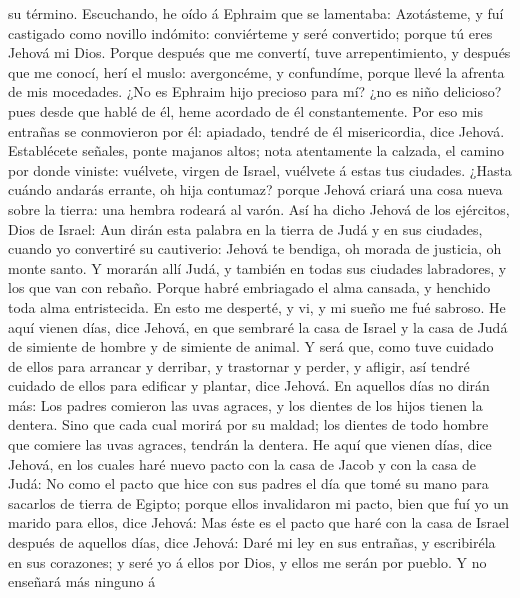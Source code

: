 su término.  Escuchando, he oído á Ephraim que se
lamentaba: Azotásteme, y fuí castigado como novillo indómito:
conviérteme y seré convertido; porque tú eres Jehová mi Dios.
 Porque después que me convertí, tuve arrepentimiento, y
después que me conocí, herí el muslo: avergoncéme, y confundíme, porque
llevé la afrenta de mis mocedades.  ¿No es Ephraim hijo
precioso para mí? ¿no es niño delicioso? pues desde que hablé de él,
heme acordado de él constantemente. Por eso mis entrañas se conmovieron
por él: apiadado, tendré de él misericordia, dice Jehová.
 Establécete señales, ponte majanos altos; nota
atentamente la calzada, el camino por donde viniste: vuélvete, virgen de
Israel, vuélvete á estas tus ciudades.  ¿Hasta cuándo
andarás errante, oh hija contumaz? porque Jehová criará una cosa nueva
sobre la tierra: una hembra rodeará al varón.  Así ha
dicho Jehová de los ejércitos, Dios de Israel: Aun dirán esta palabra en
la tierra de Judá y en sus ciudades, cuando yo convertiré su cautiverio:
Jehová te bendiga, oh morada de justicia, oh monte santo.
 Y morarán allí Judá, y también en todas sus ciudades
labradores, y los que van con rebaño.  Porque habré
embriagado el alma cansada, y henchido toda alma entristecida.
 En esto me desperté, y vi, y mi sueño me fué sabroso.
 He aquí vienen días, dice Jehová, en que sembraré la
casa de Israel y la casa de Judá de simiente de hombre y de simiente de
animal.  Y será que, como tuve cuidado de ellos para
arrancar y derribar, y trastornar y perder, y afligir, así tendré
cuidado de ellos para edificar y plantar, dice Jehová. 
En aquellos días no dirán más: Los padres comieron las uvas agraces, y
los dientes de los hijos tienen la dentera.  Sino que
cada cual morirá por su maldad; los dientes de todo hombre que comiere
las uvas agraces, tendrán la dentera.  He aquí que vienen
días, dice Jehová, en los cuales haré nuevo pacto con la casa de Jacob y
con la casa de Judá:  No como el pacto que hice con sus
padres el día que tomé su mano para sacarlos de tierra de Egipto; porque
ellos invalidaron mi pacto, bien que fuí yo un marido para ellos, dice
Jehová:  Mas éste es el pacto que haré con la casa de
Israel después de aquellos días, dice Jehová: Daré mi ley en sus
entrañas, y escribiréla en sus corazones; y seré yo á ellos por Dios, y
ellos me serán por pueblo.  Y no enseñará más ninguno á
